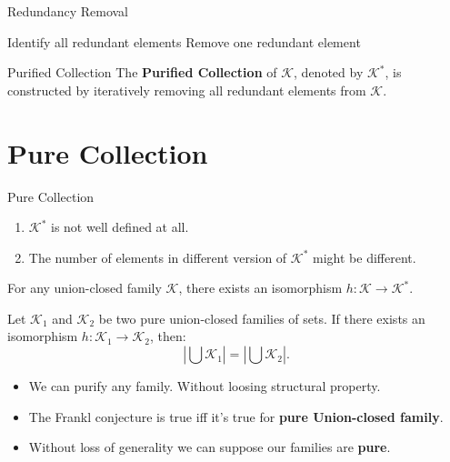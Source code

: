 \documentclass{beamer}
\begin{document}
\begin{frame}
	\begin{algorithm}[H]
		\caption[o]{Redundancy Removal}
		\begin{algorithmic}[1]
			\State Identify all redundant elements
			\State Remove one redundant element
			\EndWhile
		\end{algorithmic}
	\end{algorithm}
	\vfill
	\pause

	\begin{block}{Purified Collection}
		The \textbf{Purified Collection} of \( \mathcal{K} \), denoted by \( \mathcal{K}^* \), is constructed by iteratively removing all redundant elements from \( \mathcal{K} \).
	\end{block}

\end{frame}

\section{Pure Collection}
\begin{frame}{Pure Collection}
	\begin{enumerate}
		\item  \(\mathcal{K}^*\) is not well defined at all.
		\item The number of elements in different version of \(\mathcal{K}^*\) might be different.
	\end{enumerate}
	\vfill
	\pause
	\begin{corollary}[1.3]
		For any union-closed family \( \mathcal{K} \), there exists an isomorphism \( h: \mathcal{K} \to \mathcal{K}^* \).
	\end{corollary}

\end{frame}

\begin{frame}
	\begin{corollary}[2.1]
		Let \( \mathcal{K}_1 \) and \( \mathcal{K}_2 \) be two pure union-closed families of sets. If there exists an isomorphism \( h: \mathcal{K}_1 \to \mathcal{K}_2 \), then:
		\[
			\left|\bigcup \mathcal{K}_1\right| = \left|\bigcup \mathcal{K}_2\right|.
		\]
	\end{corollary}
\end{frame}

\begin{frame}
	\begin{itemize}
		\item We can purify any family. Without loosing structural property.
		      \pause
		\item The Frankl conjecture is true iff it's true for \textbf{pure Union-closed family}.
		      \pause
		\item Without loss of generality we can suppose our families are \textbf{pure}.

	\end{itemize}
\end{frame}
\end{document}
